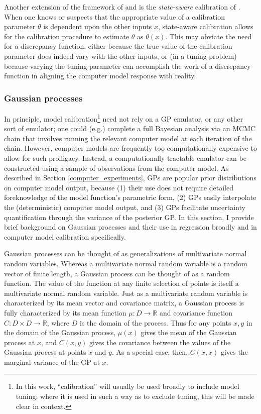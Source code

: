 \documentclass{article}
\begin{document}
Another extension of the framework of \cite{Kennedy2001} and \cite{Bayarri2007} is the \emph{state-aware} calibration of \cite{Brown2016}. When one knows or suspects that the appropriate value of a calibration parameter $\theta$ is dependent upon the other inputs $x$, state-aware calibration allows for the calibration procedure to estimate $\theta$ as $\theta(x)$. This may obviate the need for a discrepancy function, either because the true value of the calibration parameter does indeed vary with the other inputs, or (in a tuning problem) because varying the tuning parameter can accomplish the work of a discrepancy function in aligning the computer model response with reality.

\subsubsection{Gaussian processes} \label{gaussian_processes}

In principle, model calibration\footnote{In this work, ``calibration'' will usually be used broadly to include model tuning; where it is used in such a way as to exclude tuning, this will be made clear in context.}
need not rely on a GP emulator, or any other sort of emulator; one could (e.g.) complete a full Bayesian analysis via an MCMC chain that involves running the relevant computer model at each iteration of the chain. However, computer models are frequently too computationally expensive to allow for such profligacy. Instead, a computationally tractable emulator can be constructed using a sample of observations from the computer model. As described in Section \ref{computer_experiments}, GPs are popular prior distributions on computer model output, because (1) their use does not require detailed foreknowledge of the model function's parametric form, (2) GPs easily interpolate the (deterministic) computer model output, and (3) GPs facilitate uncertainty quantification through the variance of the posterior GP. In this section, I provide brief background on Gaussian processes and their use in regression broadly and in computer model calibration specifically.


Gaussian processes can be thought of as generalizations of multivariate normal random variables. Whereas a multivariate normal random variable is a random vector of finite length, a Gaussian process can be thought of as a random function. The value of the function at any finite selection of points is itself a multivariate normal random variable. Just as a multivariate random variable is characterized by its mean vector and covariance matrix, a Gaussian process is fully characterized by its mean function $\mu:D\to \mathbb R$ and covariance function $C:D\times D\to \mathbb R$, where $D$ is the domain of the process. Thus for any points $x,y$ in the domain of the Gaussian process, $\mu(x)$ gives the mean of the Gaussian process at $x$, and $C(x,y)$ gives the covariance between the values of the Gaussian process at points $x$ and $y$. As a special case, then, $C(x,x)$ gives the marginal variance of the GP at $x$. 
\end{document}
